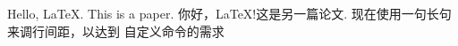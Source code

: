 Hello, \LaTeX.
This is a paper\cite{zhang2020sparch}.
你好，\LaTeX!这是另一篇论文\cite{sadi2017design}. 现在使用一句长句来调行间距，以达到
自定义命令的需求